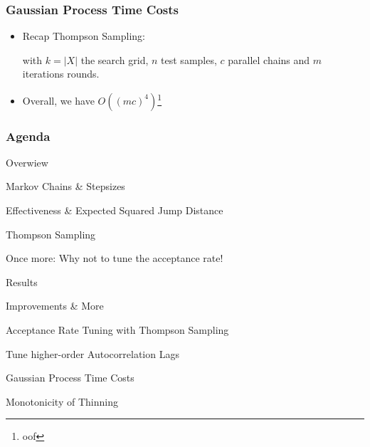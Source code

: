 \begin{frame}[c]
    \frametitle{Gaussian Process Time Costs}
    \begin{itemize}
        \item Recap Thompson Sampling:
            \begin{algorithm2e}[H]
            \end{algorithm2e}
            with $k = |X|$ the search grid, $n$ test samples, $c$ parallel chains and $m$ iterations rounds.
        \item Overall, we have $O((mc)^4)$\footnote[frame]{oof}
    \end{itemize}
\end{frame}

\begin{frame}[c]
    \frametitle{Agenda}
    \begin{itemize}
        {\color{lgray}
        \item Overwiew
        }
        \begin{itemize}
            {\color{lgray}
            \item Markov Chains \& Stepsizes
            \item Effectiveness \& Expected Squared Jump Distance 
            \item Thompson Sampling
            \item Once more: Why not to tune the acceptance rate!
            }
        \end{itemize}
        {\color{lgray}
        \item Results
        \item Improvements \& More
        }
        \begin{itemize}
            {\color{lgray}
            \item Acceptance Rate Tuning with Thompson Sampling
            \item Tune higher-order Autocorrelation Lags
            \item Gaussian Process Time Costs
            }
            \item Monotonicity of Thinning
        \end{itemize}
    \end{itemize}
\end{frame}

